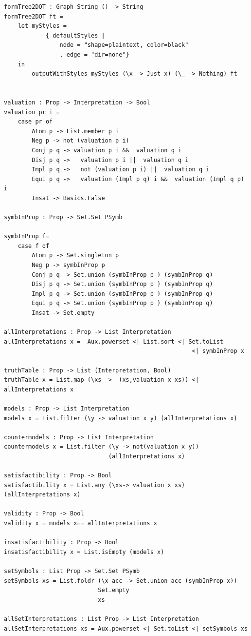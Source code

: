 \documentclass[a4paper]{report}
\begin{document}
\begin{lstlisting}[caption={Módulo SintaxSemanticsLP}, mathescape=true]
formTree2DOT : Graph String () -> String
formTree2DOT ft =
    let myStyles =
            { defaultStyles | 
                node = "shape=plaintext, color=black"
                , edge = "dir=none"}
    in 
        outputWithStyles myStyles (\x -> Just x) (\_ -> Nothing) ft


valuation : Prop -> Interpretation -> Bool
valuation pr i =
    case pr of
        Atom p -> List.member p i
        Neg p -> not (valuation p i)
        Conj p q -> valuation p i &&  valuation q i
        Disj p q ->   valuation p i ||  valuation q i
        Impl p q ->   not (valuation p i) ||  valuation q i
        Equi p q ->   valuation (Impl p q) i &&  valuation (Impl q p) i
        Insat -> Basics.False

symbInProp : Prop -> Set.Set PSymb

symbInProp f=
    case f of
        Atom p -> Set.singleton p
        Neg p -> symbInProp p
        Conj p q -> Set.union (symbInProp p ) (symbInProp q)
        Disj p q -> Set.union (symbInProp p ) (symbInProp q)
        Impl p q -> Set.union (symbInProp p ) (symbInProp q)
        Equi p q -> Set.union (symbInProp p ) (symbInProp q)
        Insat -> Set.empty

allInterpretations : Prop -> List Interpretation
allInterpretations x =  Aux.powerset <| List.sort <| Set.toList 
                                                      <| symbInProp x

truthTable : Prop -> List (Interpretation, Bool)
truthTable x = List.map (\xs ->  (xs,valuation x xs)) <| allInterpretations x

models : Prop -> List Interpretation
models x = List.filter (\y -> valuation x y) (allInterpretations x)

countermodels : Prop -> List Interpretation
countermodels x = List.filter (\y -> not(valuation x y)) 
                              (allInterpretations x)

satisfactibility : Prop -> Bool
satisfactibility x = List.any (\xs-> valuation x xs) (allInterpretations x)

validity : Prop -> Bool
validity x = models x== allInterpretations x

insatisfactibility : Prop -> Bool
insatisfactibility x = List.isEmpty (models x)

setSymbols : List Prop -> Set.Set PSymb
setSymbols xs = List.foldr (\x acc -> Set.union acc (symbInProp x)) 
                           Set.empty 
                           xs

allSetInterpretations : List Prop -> List Interpretation
allSetInterpretations xs = Aux.powerset <| Set.toList <| setSymbols xs


\end{lstlisting}
\end{document}
